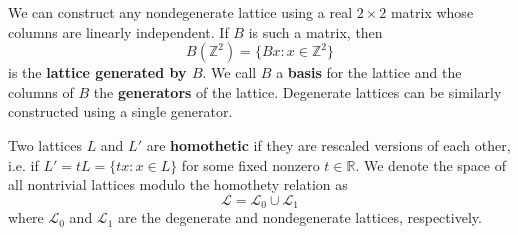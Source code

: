 \documentclass[12pt,twoside]{reedthesis}
\theoremstyle{definition}
\newcommand{\Z}{\mathbb{Z}}
\newcommand{\R}{\mathbb{R}}
\newcommand{\LS}{\mathcal{L}}
\newcommand{\defnphrase}[1]{\textbf{#1}}
\begin{document}
We can construct any nondegenerate lattice using a real $2 \times 2$ matrix whose columns are linearly independent.
If $B$ is such a matrix, then
\begin{equation*}
  B(\Z^2) = \{ B x : x \in \Z^2 \}
\end{equation*}
is the \defnphrase{lattice generated by $B$}.
We call $B$ a \defnphrase{basis} for the lattice and the columns of $B$ the \defnphrase{generators} of the lattice.
Degenerate lattices can be similarly constructed using a single generator.

Two lattices $L$ and $L'$ are \defnphrase{homothetic} if they are rescaled versions of each other, i.e. if $L' = tL = \{t x : x \in L\}$ for some fixed nonzero $t \in \R$.
We denote the space of all nontrivial lattices modulo the homothety relation as 
\begin{equation*}
  \LS = \LS_0 \cup \LS_1
\end{equation*}
where $\LS_0$ and $\LS_1$ are the degenerate and nondegenerate lattices, respectively.
\end{document}
